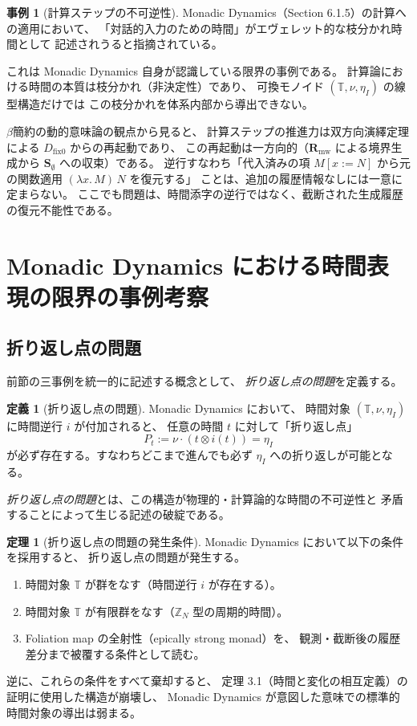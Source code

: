 \documentclass[11pt,a4paper]{ltjsarticle}
\newcommand{\dfix}{D_{\mathrm{fix}0}}
\newcommand{\Rmw}{\mathbf{R}_{\mathrm{mw}}}
\newcommand{\Svoid}{\mathbf{S}_{\emptyset}}
\theoremstyle{definition}
\newtheorem{definition}{定義}[section]
\newtheorem{theorem}{定理}[section]
\newtheorem{example}{事例}[section]
\begin{document}
\begin{example}[計算ステップの不可逆性]
Monadic Dynamics（Section 6.1.5）の計算への適用において、
「対話的入力のための時間」がエヴェレット的な枝分かれ時間として
記述されうると指摘されている。

これは Monadic Dynamics 自身が認識している限界の事例である。
計算論における時間の本質は枝分かれ（非決定性）であり、
可換モノイド $(\mathbb{T}, \nu, \eta_I)$ の線型構造だけでは
この枝分かれを体系内部から導出できない。

$\beta$簡約の動的意味論の観点から見ると、
計算ステップの推進力は双方向演繹定理による $\dfix$ からの再起動であり、
この再起動は一方向的（$\Rmw$ による境界生成から $\Svoid$ への収束）である。
逆行すなわち「代入済みの項 $M[x:=N]$ から元の関数適用 $(\lambda x.\, M)\, N$ を復元する」
ことは、追加の履歴情報なしには一意に定まらない。
ここでも問題は、時間添字の逆行ではなく、截断された生成履歴の復元不能性である。
\end{example}

\section{Monadic Dynamics における時間表現の限界の事例考察}

\subsection{折り返し点の問題}

前節の三事例を統一的に記述する概念として、
\emph{折り返し点の問題}を定義する。

\begin{definition}[折り返し点の問題]
Monadic Dynamics において、
時間対象 $(\mathbb{T}, \nu, \eta_I)$ に時間逆行 $i$ が付加されると、
任意の時間 $t$ に対して「折り返し点」
\[
P_t := \nu \cdot (t \otimes i(t)) = \eta_I
\]
が必ず存在する。すなわちどこまで進んでも必ず $\eta_I$ への折り返しが可能となる。

\emph{折り返し点の問題}とは、この構造が物理的・計算論的な時間の不可逆性と
矛盾することによって生じる記述の破綻である。
\end{definition}

\begin{theorem}[折り返し点の問題の発生条件]
Monadic Dynamics において以下の条件を採用すると、
折り返し点の問題が発生する。

\begin{enumerate}
\item 時間対象 $\mathbb{T}$ が群をなす（時間逆行 $i$ が存在する）。
\item 時間対象 $\mathbb{T}$ が有限群をなす（$\mathbb{Z}_N$ 型の周期的時間）。
\item Foliation map の全射性（epically strong monad）を、
  観測・截断後の履歴差分まで被覆する条件として読む。
\end{enumerate}

逆に、これらの条件をすべて棄却すると、
定理 3.1（時間と変化の相互定義）の証明に使用した構造が崩壊し、
Monadic Dynamics が意図した意味での標準的時間対象の導出は弱まる。
\end{theorem}
\end{document}
